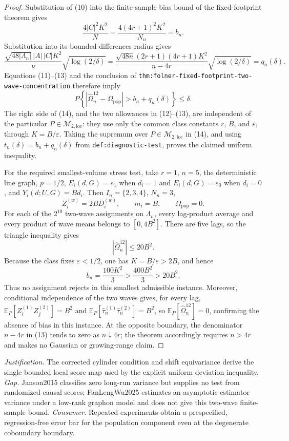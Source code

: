 \documentclass{article}
\begin{document}
\begin{proof}
Substitution of (10) into the finite-sample bias bound of the fixed-footprint theorem gives
\[
 \frac{4|C|^2K^2}{N}
 =\frac{4(4r+1)^2K^2}{N_n}
 =b_n. \tag{12}
\]
Substitution into its bounded-differences radius gives
\[
 \frac{\sqrt{48|\Lambda_n|}\,|A|\,|C|K^2}{\nu}
 \sqrt{\log(2/\delta)}
 =\frac{\sqrt{48n}(2r+1)(4r+1)K^2}{n-4r}
 \sqrt{\log(2/\delta)}
 =q_n(\delta). \tag{13}
\]
Equations (11)--(13) and the conclusion of \texttt{thm:folner-fixed-footprint-two-wave-concentration} therefore imply
\[
 P\!\left\{
  \left|\widehat\Omega_n^{12}-\Omega_{\mathrm{pop}}\right|
  >b_n+q_n(\delta)
 \right\}\le\delta. \tag{14}
\]
The right side of (14), and the two allowances in (12)--(13), are independent of the particular \(P\in\mathcal M_{2,\mathrm{loc}}\): they use only the common class constants \(r\), \(B\), and \(\varepsilon\), through \(K=B/\varepsilon\).  Taking the supremum over \(P\in\mathcal M_{2,\mathrm{loc}}\) in (14), and using \(t_n(\delta)=b_n+q_n(\delta)\) from \texttt{def:diagnostic-test}, proves the claimed uniform inequality.

For the required smallest-volume stress test, take \(r=1\), \(n=5\), the deterministic line graph, \(p=1/2\), \(E_i(d,G)=e_1\) when \(d_i=1\) and \(E_i(d,G)=e_0\) when \(d_i=0\), and \(Y_i(d;U,G)=Bd_i\).  Then \(I_n=\{2,3,4\}\), \(N_n=3\),
\[
 Z_i^{(w)}=2BD_i^{(w)},
 \qquad m_i=B,
 \qquad \Omega_{\mathrm{pop}}=0. \tag{15}
\]
For each of the \(2^{10}\) two-wave assignments on \(\Lambda_n\), every lag-product average and every product of wave means belongs to \([0,4B^2]\).  There are five lags, so the triangle inequality gives
\[
 |\widehat\Omega_n^{12}|\le 20B^2. \tag{16}
\]
Because the class fixes \(\varepsilon<1/2\), one has \(K=B/\varepsilon>2B\), and hence
\[
 b_n=\frac{100K^2}{3}>\frac{400B^2}{3}>20B^2. \tag{17}
\]
Thus no assignment rejects in this smallest admissible instance.  Moreover, conditional independence of the two waves gives, for every lag, \(\mathbb E_P[Z_i^{(1)}Z_j^{(2)}]=B^2\) and \(\mathbb E_P[\widehat\tau_n^{(1)}\widehat\tau_n^{(2)}]=B^2\), so \(\mathbb E_P[\widehat\Omega_n^{12}]=0\), confirming the absence of bias in this instance.  At the opposite boundary, the denominator \(n-4r\) in (13) tends to zero as \(n\downarrow4r\); the theorem accordingly requires \(n>4r\) and makes no Gaussian or growing-range claim.
\end{proof}
\par\smallskip\noindent \textit{Justification.} The corrected cylinder condition and shift equivariance derive the single bounded local score map used by the explicit uniform deviation inequality. \textit{Gap.} Janson2015 classifies zero long-run variance but supplies no test from randomized causal scores; FanLengWu2025 estimates an asymptotic estimator variance under a low-rank graphon model and does not give this two-wave finite-sample bound. \textit{Consumer.} Repeated experiments obtain a prespecified, regression-free error bar for the population component even at the degenerate coboundary boundary.
\end{document}
